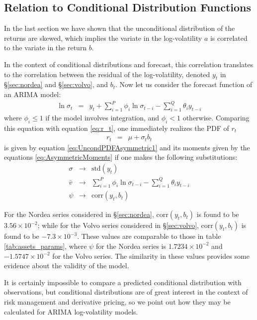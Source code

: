 \subsection{Relation to Conditional Distribution Functions}
In the last section we have shown that the unconditional distribution of
the returns are skewed, which implies the variate in the
log-volatility $a$ is correlated to the variate in the return
$b$.

In the context of conditional distributions and forecast, this
correlation translates to the correlation between the residual of the
log-volatility, denoted $y_t$ in \S\ref{sec:nordea} and
\S\ref{sec:volvo}, and $b_t$. Now let us consider the forecast
function of an ARIMA model:
\begin{eqnarray*}
  \ln \sigma_t &=& y_t + \sum_{i=1}^P \phi_i \ln \sigma_{t-i} -
  \sum_{i=1}^Q \theta_i y_{t-i}
\end{eqnarray*}
where $\phi_i \leq 1$ if the model involves integration, and $\phi_i <
1$ otherwise. Comparing this equation with equation \ref{eq:r_t}, one
immediately realizes the PDF of $r_t$
\begin{eqnarray*}
  r_t &=& \mu + \sigma_t b_t
\end{eqnarray*}
is given by equation \ref{eq:UncondPDFAsymmetric1} and its moments
given by the equations \ref{eq:AsymmetricMoments} if one makes the
following substitutions:
\begin{eqnarray*}
  \sigma &\to& \text{std}(y_t) \\
  \bar{v} &\to& \sum_{i=1}^P \phi_i \ln \sigma_{t-i} - \sum_{i=1}^Q
  \theta_i y_{t-i} \\
  \psi &\to& \text{corr}(y_t, b_t)
\end{eqnarray*}

For the Nordea series considered in \S\ref{sec:nordea},
$\text{corr}(y_t, b_t)$ is found to be $3.56 \times 10^{-2}$; while
for the Volvo series considered in \S\ref{sec:volvo},
$\text{corr}(y_t, b_t)$ is found to be $-7.3 \times 10^{-3}$. These
values are comparable to those in table \ref{tab:assets_params}, where
$\psi$ for the Nordea series is $1.7234 \times 10^{-2}$ and $-1.5747
\times 10^{-2}$ for the Volvo series. The similarity in these values
provides some evidence about the validity of the model.

It is certainly impossible to compare a predicted conditional
distribution with observations, but conditional distributions are of
great interest in the context of risk management and derivative
pricing, so we point out how they may be calculated for ARIMA
log-volatility models.
